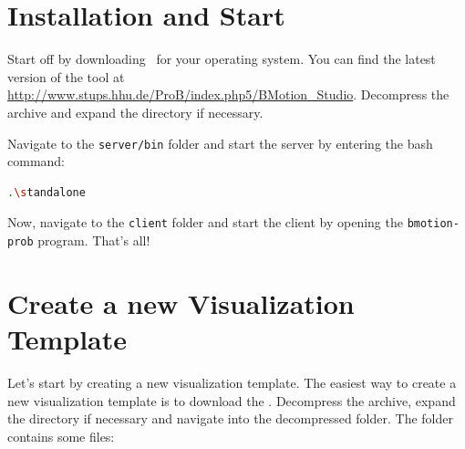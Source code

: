 \section{Installation and Start}
\label{installation}

Start off by downloading \bms~for your operating system. 
You can find the latest version of the tool at \url{http://www.stups.hhu.de/ProB/index.php5/BMotion_Studio}.
Decompress the archive and expand the directory if necessary. 


Navigate to the \texttt{server/bin} folder and start the server by entering the bash command:

\begin{lstlisting}[language=bash]
.\standalone
\end{lstlisting}


Now, navigate to the \texttt{client} folder and start the client by opening the \texttt{bmotion-prob} program.
That's all! 


\section{Create a new Visualization Template}
\label{vis_template}

Let's start by creating a new visualization template.
The easiest way to create a new visualization template is to download the .
Decompress the archive, expand the directory if necessary and navigate into the decompressed folder.
The folder contains some files:


